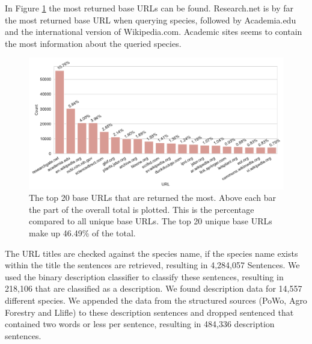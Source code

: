 \documentclass[a4paper, 12pt, oneside]{book} %
\begin{document}
In Figure \ref{fig:URL_top20} the most returned base URLs can be found.
Research.net is by far the most returned base URL when querying species, followed by Academia.edu and the international version of Wikipedia.com.
Academic sites seems to contain the most information about the queried species.
\begin{figure}[t]
 \centering
 \includegraphics[width=\textwidth]{figures/URL_top20.pdf}
 \caption[The top 20 returned base URLs]{The top 20 base URLs that are returned the most. Above each bar the part of the overall total is plotted. This is the percentage compared to all unique base URLs. The top 20 unique base URLs make up 46.49\% of the total.}
 \label{fig:URL_top20}
\end{figure}

The URL titles are checked against the species name, if the species name exists within the title the sentences are retrieved, resulting in 4,284,057 Sentences.
We used the binary description classifier to classify these sentences, resulting in 218,106 that are classified as a description.
We found description data for 14,557 different species.
We appended the data from the structured sources (PoWo, Agro Forestry and Llifle) to these description sentences and dropped sentenced that contained two words or less per sentence, resulting in 484,336 description sentences.
\end{document}
